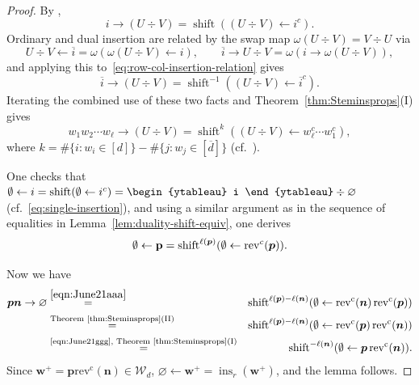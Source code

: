 \documentclass[12pt]{amsart}
\newcommand{\bs}{\boldsymbol}
\theoremstyle{definition}
\theoremstyle{remark}
\newcommand{\barindex}[1]{\overline{#1}}
\begin{document}
\begin{proof}
By \cite[Lemma~6.3]{Stroomer}, 
\begin{equation} \label{eq:row-col-insertion-relation}
i\rightarrow (U\div V) = \operatorname{shift}((U\div V)\leftarrow i^c).
\end{equation}
Ordinary and dual insertion are related by the swap map $\omega(U\div V) = V\div U$ via
\[
U\div V\leftarrow \barindex{i} = \omega(\omega(U\div V)\leftarrow i),
\qquad \barindex{i}\rightarrow U\div V = \omega(i\rightarrow \omega(U\div V)),
\]
and applying this to~\eqref{eq:row-col-insertion-relation} gives
\[
\barindex{i}\rightarrow (U\div V) = \operatorname{shift}^{-1}((U\div V)\leftarrow \barindex{i}^c).
\]
Iterating the combined use of these two facts and Theorem~\ref{thm:Steminsprops}(I) gives
\begin{equation}
\label{eqn:June21aaa}
w_1 w_2 \cdots w_\ell \rightarrow (U\div V) = \operatorname{shift}^k((U\div V)\leftarrow w_\ell^c\cdots w_1^c),
\end{equation}
where $k=\#\{i:w_i\in [d]\}-\#\{j: w_j \in [\barindex{d}]\}$ (cf.~\cite[Lemma~6.4]{Stroomer}). 

One checks that
$\emptyset\leftarrow i = \operatorname{shift}(\emptyset\leftarrow {i}^c) = \vcenter{\hbox{\begin{ytableau} i \end{ytableau}}}
\div\varnothing$ (cf.~\eqref{eq:single-insertion}), and using a similar argument as in the sequence of equalities in
Lemma~\ref{lem:duality-shift-equiv}, one derives
\begin{equation}
\label{eqn:June21ggg}
\emptyset\leftarrow {\bf p} = \operatorname{shift}^{\ell({\bs p})}(\emptyset\leftarrow \operatorname{rev}^c({\bs p})).
\end{equation}

Now we have
\begin{eqnarray}\nonumber
\bs{p}\bs{n}\rightarrow \varnothing & \stackrel{\eqref{eqn:June21aaa}}{=} &  \operatorname{shift}^{\ell(\bs{p})-\ell(\bs{n})}(\emptyset\leftarrow \operatorname{rev^c}(\bs{n}) \operatorname{rev^c}(\bs{p}))  \\ \nonumber
& \stackrel{\text{Theorem~\ref{thm:Steminsprops}(II)}}{=} & \operatorname{shift}^{\ell(\bs{p})-\ell(\bs{n})}(\emptyset\leftarrow \operatorname{rev^c}(\bs{p}) \operatorname{rev^c}(\bs{n}))\\ \nonumber
& \stackrel{\text{\eqref{eqn:June21ggg}, Theorem~\ref{thm:Steminsprops}(I)}}{=} & \operatorname{shift}^{-\ell(\bs{n})}(\emptyset\leftarrow \bs{p} \operatorname{rev^c}(\bs{n})). \nonumber\end{eqnarray}
Since ${\bs w}^+= {\bs p}\operatorname{rev^c}(\bs{n})\in {\mathcal W}_d$, $\varnothing\leftarrow {\bs w}^+=\operatorname{ins}_r({\bs w}^+)$,
and the lemma follows. \end{proof}
\end{document}
